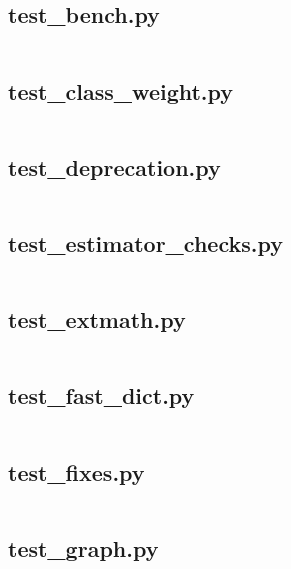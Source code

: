 \documentclass{article}
\begin{document}
\subsection{test\_bench.py}
\inputminted{python}{/home/dufferzafar/dev/@clones/scikit-learn/sklearn/utils/tests/test_bench.py}
\newpage

\subsection{test\_class\_weight.py}
\inputminted{python}{/home/dufferzafar/dev/@clones/scikit-learn/sklearn/utils/tests/test_class_weight.py}
\newpage

\subsection{test\_deprecation.py}
\inputminted{python}{/home/dufferzafar/dev/@clones/scikit-learn/sklearn/utils/tests/test_deprecation.py}
\newpage

\subsection{test\_estimator\_checks.py}
\inputminted{python}{/home/dufferzafar/dev/@clones/scikit-learn/sklearn/utils/tests/test_estimator_checks.py}
\newpage

\subsection{test\_extmath.py}
\inputminted{python}{/home/dufferzafar/dev/@clones/scikit-learn/sklearn/utils/tests/test_extmath.py}
\newpage

\subsection{test\_fast\_dict.py}
\inputminted{python}{/home/dufferzafar/dev/@clones/scikit-learn/sklearn/utils/tests/test_fast_dict.py}
\newpage

\subsection{test\_fixes.py}
\inputminted{python}{/home/dufferzafar/dev/@clones/scikit-learn/sklearn/utils/tests/test_fixes.py}
\newpage

\subsection{test\_graph.py}
\inputminted{python}{/home/dufferzafar/dev/@clones/scikit-learn/sklearn/utils/tests/test_graph.py}
\newpage
\end{document}

